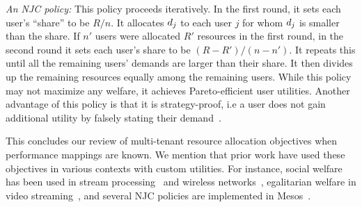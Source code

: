 \emph{An NJC policy:}
This policy proceeds iteratively.
In the first round, it sets each user's ``share'' to be $R/n$.
It allocates $d_{j}$ to each user $j$ for whom $d_{j}$ is smaller than the share.
If $n'$ users were allocated $R'$ resources in the first round, in the second round it
sets each user's share to be $(R-R')/(n-n')$.
It repeats this until all the remaining
users' demands are  larger than their share.
It then divides up the remaining resources equally among the remaining users.
While this policy may not maximize any welfare, it achieves Pareto-efficient user utilities. Another advantage 
 of this policy 
is that it is strategy-proof, i.e a user does not gain additional utility by falsely
stating their demand~\cite{ghodsi2011dominant,gutman2012fair,kandasamy20online}. 


This concludes our review of multi-tenant resource allocation objectives when performance mappings
are known.
We mention that prior work have used these objectives in
various contexts with custom utilities.
For instance, social welfare has been used in stream processing~\cite{kalim2018henge}
and wireless networks~\cite{tun2019wireless},
egalitarian welfare in video streaming~\cite{nathan2019end},
and several NJC policies are implemented in Mesos~\cite{mesos}.


